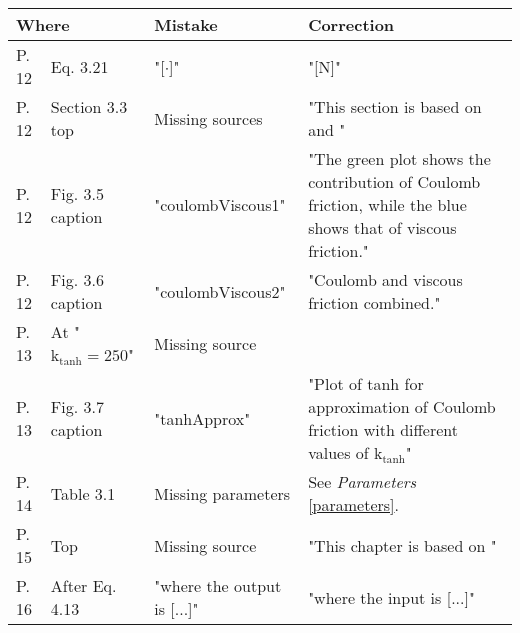 \begin{table}[H]
  \begin{tabular}{|lp{4cm}|p{10cm}|p{10cm}|}
    \hline %
    \multicolumn{2}{|l|}{\textbf{Where}} & \textbf{Mistake} & \textbf{Correction} \\
    \hline %
    P. 12 & Eq. 3.21            & "[$\cdot$]"      &  "[\si{N}]"         \\
    \hline %
    P. 12 & Section 3.3 top     & Missing sources & "This section is based on \cite{CMClose} and \cite{HOlsson}"\\
    \hline %
    P. 12 & Fig. 3.5 caption    & "coulombViscous1" & "The green plot shows the contribution of Coulomb friction, while the blue shows that of viscous friction."\\
    \hline %
    P. 12 & Fig. 3.6 caption    & "coulombViscous2" & "Coulomb and viscous friction combined."  \\
    \hline %
    P. 13 & At "$\mathrm{k}_\mathrm{tanh}=250$" & Missing source &  \cite{JHHorgensen}  \\
    \hline %
    P. 13 & Fig. 3.7 caption    & "tanhApprox"     & "Plot of tanh for approximation of Coulomb friction with different values of $\mathrm{k}_\mathrm{tanh}$" \\
    \hline %
    P. 14 & Table 3.1           & Missing parameters & See \textit{Parameters} \autoref{parameters}.\\
    \hline %
    P. 15 & Top                 & Missing source   &  "This chapter is based on \cite{HKKhalil}" \\
    \hline %
    P. 16 & After Eq. 4.13      & "where the output is [...]" & "where the input is [...]"  \\
    \hline %

\end{tabular}
\end{table}
